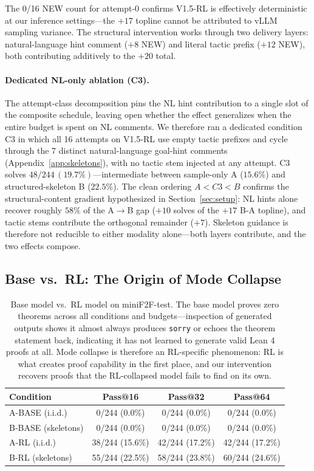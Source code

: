 \documentclass{article}
\begin{document}
The 0/16 NEW count for attempt-0 confirms V1.5-RL is effectively deterministic at our inference settings---the $+17$ topline cannot be attributed to vLLM sampling variance. The structural intervention works through two delivery layers: natural-language hint comment ($+8$ NEW) and literal tactic prefix ($+12$ NEW), both contributing additively to the $+20$ total.

\paragraph{Dedicated NL-only ablation (C3).}
The attempt-class decomposition pins the NL hint contribution to a single slot of the composite schedule, leaving open whether the effect generalizes when the entire budget is spent on NL comments. We therefore ran a dedicated condition C3 in which all 16 attempts on V1.5-RL use empty tactic prefixes and cycle through the 7 distinct natural-language goal-hint comments (Appendix~\ref{app:skeletons}), with no tactic stem injected at any attempt. C3 solves $48/244\,(19.7\%)$---intermediate between sample-only A ($15.6\%$) and structured-skeleton B ($22.5\%$). The clean ordering $A < C3 < B$ confirms the structural-content gradient hypothesized in Section~\ref{sec:setup}: NL hints alone recover roughly $58\%$ of the A$\to$B gap ($+10$ solves of the $+17$ B-A topline), and tactic stems contribute the orthogonal remainder ($+7$). Skeleton guidance is therefore not reducible to either modality alone---both layers contribute, and the two effects compose.

\subsection{Base vs.\ RL: The Origin of Mode Collapse}
\label{sec:base_vs_rl}

\begin{table}[t]
\centering
\begin{tabular}{lccc}
\toprule
\textbf{Condition} & \textbf{Pass@16} & \textbf{Pass@32} & \textbf{Pass@64} \\
\midrule
A-BASE (i.i.d.) & 0/244 (0.0\%) & 0/244 (0.0\%) & 0/244 (0.0\%) \\
B-BASE (skeletons) & 0/244 (0.0\%) & 0/244 (0.0\%) & 0/244 (0.0\%) \\
\midrule
A-RL (i.i.d.) & 38/244 (15.6\%) & 42/244 (17.2\%) & 42/244 (17.2\%) \\
B-RL (skeletons) & 55/244 (22.5\%) & 58/244 (23.8\%) & 60/244 (24.6\%) \\
\bottomrule
\end{tabular}
\caption{Base model vs.\ RL model on miniF2F-test. The base model proves zero theorems across all conditions and budgets---inspection of generated outputs shows it almost always produces \texttt{sorry} or echoes the theorem statement back, indicating it has not learned to generate valid Lean 4 proofs at all. Mode collapse is therefore an RL-specific phenomenon: RL is what creates proof capability in the first place, and our intervention recovers proofs that the RL-collapsed model fails to find on its own.}
\label{tab:base}
\end{table}
\end{document}
